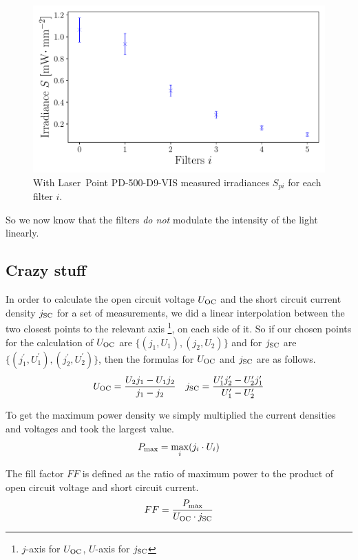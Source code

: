 \documentclass[a4paper,10pt,twocolumn]{article}
\begin{document}
\begin{extract*}
\begin{figure}[h]
	\includegraphics[scale=0.5]{../2_Pictures/Photodiode_irradiance.pdf}
	\caption{With Laser~Point PD-500-D9-VIS measured irradiances $S_{pi}$ for each filter $i$.}
	\label{fig:photodiode_irradiances}
\end{figure}

So we now know that the filters \emph{do not} modulate the intensity of the light linearly.

\subsection{Crazy stuff}


In order to calculate the open circuit voltage $U_{\text{OC}}$ and the short circuit current density $j_{\text{SC}}$ for a set of measurements, we did a linear interpolation between the two closest points to the relevant axis \footnote{$j$-axis for $U_{\text{OC}}$, $U$-axis for $j_{\text{SC}}$}, on each side of it. So if our chosen points for the calculation of $U_{\text{OC}}$ are $\{(j_1,U_1),(j_2,U_2)\}$ and for $j_{\text{SC}}$ are $\{(j_1^\prime,U_1^\prime),(j_2^\prime,U_2^\prime)\}$, then the formulas for $U_{\text{OC}}$ and $j_{\text{SC}}$ are as follows.
\begin{align}
	U_{\text{OC}} = \frac{U_2 j_1 - U_1 j_2}{j_1-j_2}\quad j_{\text{SC}} = \frac{U_1^\prime j_2^\prime - U_2^\prime j_1^\prime}{U_1^\prime-U_2^\prime}
\end{align}

To get the maximum power density we simply multiplied the current densities and voltages and took the largest value.
\begin{align}
	P_{\text{max}} = \max_{i} (j_i\cdot U_i)
\end{align}

The fill factor $FF$ is defined as the ratio of maximum power to the product of open circuit voltage and short circuit current.
\begin{align}
	FF = \frac{P_{\text{max}}}{U_{\text{OC}} \cdot j_{\text{SC}}}
\end{align}


\end{extract*}
\end{document}
